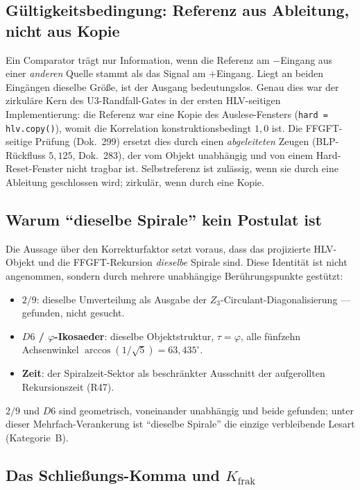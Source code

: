\subsection*{Gültigkeitsbedingung: Referenz aus Ableitung, nicht aus Kopie}

Ein Comparator trägt nur Information, wenn die Referenz am $-$Eingang aus einer
\emph{anderen} Quelle stammt als das Signal am $+$Eingang. Liegt an beiden
Eingängen dieselbe Größe, ist der Ausgang bedeutungslos. Genau dies war der
zirkuläre Kern des U3-Randfall-Gates in der ersten HLV-seitigen
Implementierung: die Referenz war eine Kopie des Auslese-Fensters
(\texttt{hard = hlv.copy()}), womit die Korrelation konstruktionsbedingt $1{,}0$
ist. Die FFGFT-seitige Prüfung (Dok.~299) ersetzt dies durch einen
\emph{abgeleiteten} Zeugen (BLP-Rückfluss $5{,}125$, Dok.~283), der vom Objekt
unabhängig und von einem Hard-Reset-Fenster nicht tragbar ist. Selbstreferenz
ist zulässig, wenn sie durch eine Ableitung geschlossen wird; zirkulär, wenn
durch eine Kopie.

\subsection*{Warum \enquote{dieselbe Spirale} kein Postulat ist}

Die Aussage über den Korrekturfaktor setzt voraus, dass das projizierte
HLV-Objekt und die FFGFT-Rekursion \emph{dieselbe} Spirale sind. Diese
Identität ist nicht angenommen, sondern durch mehrere unabhängige
Berührungspunkte gestützt:
\begin{itemize}
  \item \textbf{$2/9$}: dieselbe Umverteilung als Ausgabe der
    $Z_3$-Circulant-Diagonalisierung --- gefunden, nicht gesucht.
  \item \textbf{$D6$ / $\varphi$-Ikosaeder}: dieselbe Objektstruktur,
    $\tau=\varphi$, alle fünfzehn Achsenwinkel $\arccos(1/\sqrt5)=63{,}435^\circ$.
  \item \textbf{Zeit}: der Spiralzeit-Sektor als beschränkter Ausschnitt der
    aufgerollten Rekursionszeit (R47).
\end{itemize}
$2/9$ und $D6$ sind geometrisch, voneinander unabhängig und beide gefunden;
unter dieser Mehrfach-Verankerung ist \enquote{dieselbe Spirale} die einzige
verbleibende Lesart (Kategorie~B).

\subsection*{Das Schließungs-Komma und $K_{\text{frak}}$}

